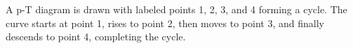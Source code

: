 A p-T diagram is drawn with labeled points 1, 2, 3, and 4 forming a cycle. The curve starts at point 1, rises to point 2, then moves to point 3, and finally descends to point 4, completing the cycle.